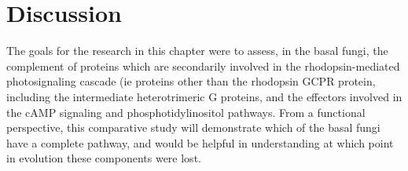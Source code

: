 \section{Discussion}
The goals for the research in this chapter were to assess, in the basal fungi, the complement of proteins which are secondarily involved in the rhodopsin-mediated photosignaling cascade (ie proteins other than the rhodopsin GCPR protein, including the intermediate heterotrimeric G proteins, and the effectors involved in the cAMP signaling and phosphotidylinositol pathways. From a functional perspective, this comparative study will demonstrate which of the basal fungi have a complete pathway, and would be helpful in understanding at which point in evolution these components were lost.\\
\indent \\
